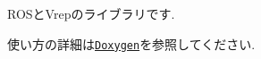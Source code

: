 R\-O\-Sと\-Vrepのライブラリです.

使い方の詳細は\href{https://github.com/kurenaif/ROSVrepLib/blob/master/html/index.html}{\tt Doxygen}を参照してください. 